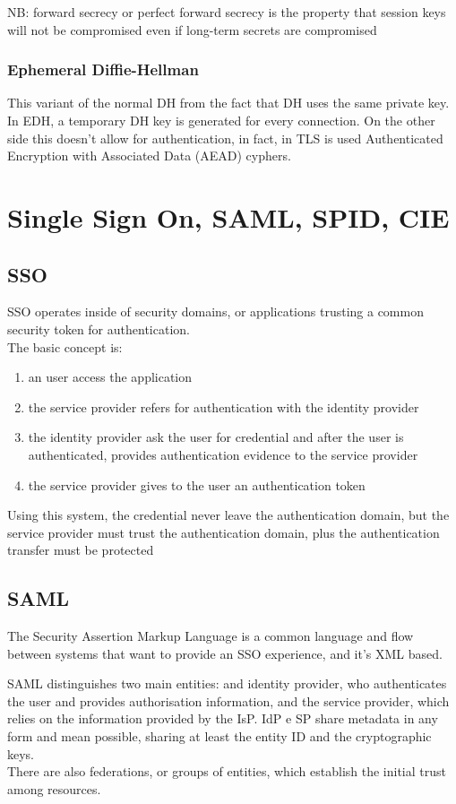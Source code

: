 \documentclass[12pt, a4paper]{article}
\begin{document}
NB: forward secrecy or perfect forward secrecy is the property that session keys will not be compromised even
if long-term secrets are compromised

\subsubsection{Ephemeral Diffie-Hellman}
This variant of the normal DH from the fact that DH uses the same private key. In EDH, a temporary DH key is 
generated for every connection. On the other side this doesn't allow for authentication, in fact, in TLS is used 
Authenticated Encryption with Associated Data (AEAD) cyphers.

\newpage
\section{Single Sign On, SAML, SPID, CIE}
\subsection{SSO}

SSO operates inside of security domains, or applications trusting a common security token for authentication.\\
The basic concept is:
\begin{enumerate}
    \item an user access the application
    \item the service provider refers for authentication with the identity provider
    \item the identity provider ask the user for credential and after the user is authenticated, provides 
    authentication evidence to the service provider
    \item the service provider gives to the user an authentication token
\end{enumerate}

Using this system, the credential never leave the authentication domain, but the service provider must trust 
the authentication domain, plus the authentication transfer must be protected

\subsection{SAML}
The Security Assertion Markup Language is a common language and flow between systems that want to provide an SSO 
experience, and it's XML based.

SAML distinguishes two main entities: and identity provider, who authenticates the user and provides authorisation 
information, and the service provider, which relies on the information provided by the IsP. IdP e SP share 
metadata in any form and mean possible, sharing at least the entity ID and the cryptographic keys.\\
There are also federations, or groups of entities, which establish the initial trust among resources.
\end{document}
